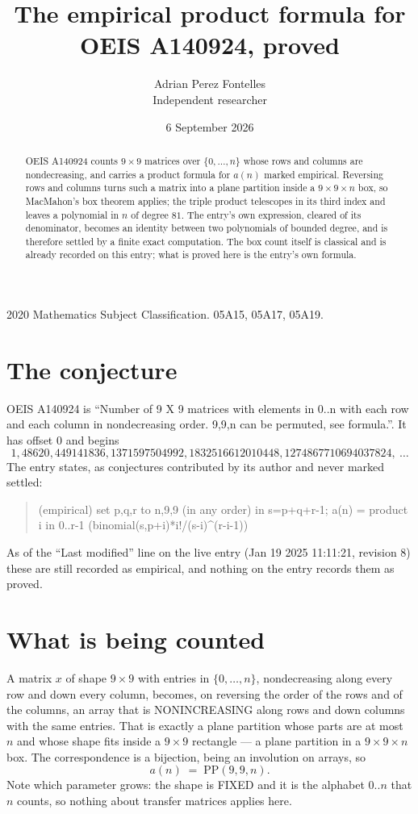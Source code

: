 \documentclass[11pt,a4paper]{article}
\title{The empirical product formula for OEIS A140924, proved}
\author{Adrian Perez Fontelles\\ \small Independent researcher}
\date{6 September 2026}
\theoremstyle{plain}
\theoremstyle{definition}
\begin{document}
\maketitle

\begin{abstract}
OEIS A140924 counts $9\times9$ matrices over $\{0,\dots,n\}$ whose rows and columns are
nondecreasing, and carries a product formula for $a(n)$ marked empirical. Reversing rows and
columns turns such a matrix into a plane partition inside a $9\times9\times n$ box, so
MacMahon's box theorem applies; the triple product telescopes in its third index and leaves a
polynomial in $n$ of degree $81$. The entry's own expression, cleared of its denominator,
becomes an identity between two polynomials of bounded degree, and is therefore settled by a
finite exact computation. The box count itself is classical and is already recorded on this
entry; what is proved here is the entry's own formula.
\end{abstract}

\noindent\small 2020 Mathematics Subject Classification. 05A15, 05A17, 05A19.\normalsize

\section{The conjecture}

OEIS A140924 is ``Number of 9 X 9 matrices with elements in 0..n with each row and each column in nondecreasing order. 9,9,n can be permuted, see formula.''. It has offset $0$ and begins
\[
1, 48620, 449141836, 1371597504992, 1832516612010448, 1274867710694037824,\ \dots
\]
The entry states, as conjectures contributed by its author and never marked settled:
\begin{quote}
(empirical) set p,q,r to n,9,9 (in any order) in s=p+q+r-1; a(n) = product {i in 0..r-1} (binomial(s,p+i)*i!/(s-i)\^{}(r-i-1))

\end{quote}
As of the ``Last modified'' line on the live entry (Jan 19 2025 11:11:21, revision 8) these are still
recorded as empirical, and nothing on the entry records them as proved.

\section{What is being counted}

A matrix $x$ of shape $9\times9$ with entries in $\{0,\dots,n\}$, nondecreasing along
every row and down every column, becomes, on reversing the order of the rows and of the
columns, an array that is NONINCREASING along rows and down columns with the same entries. That
is exactly a plane partition whose parts are at most $n$ and whose shape fits inside a
$9\times9$ rectangle --- a plane partition in a $9\times9\times n$ box. The
correspondence is a bijection, being an involution on arrays, so
\[
a(n)\;=\;\mathrm{PP}(9,9,n).
\]
Note which parameter grows: the shape is FIXED and it is the alphabet $0..n$ that $n$ counts,
so nothing about transfer matrices applies here.
\end{document}
